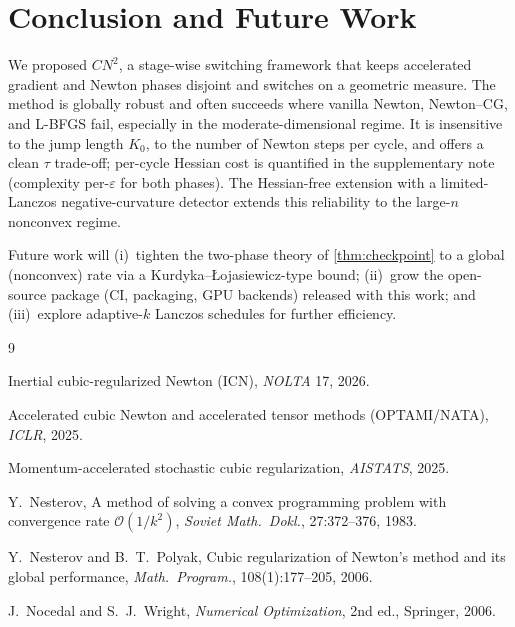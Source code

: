 \documentclass[11pt]{article}
\newcommand{\cn}{CN^2}
\begin{document}
\section{Conclusion and Future Work}
\label{sec:concl}

We proposed $\cn$, a stage-wise switching framework that keeps accelerated gradient and
Newton phases disjoint and switches on a geometric measure. The method is globally robust
and often succeeds where vanilla Newton, Newton--CG, and L-BFGS fail, especially in the
moderate-dimensional regime. It is insensitive to the jump length $K_0$, to the number of
Newton steps per cycle, and offers a clean $\tau$ trade-off; per-cycle Hessian cost is
quantified in the supplementary note (complexity per-$\varepsilon$ for both phases).
The Hessian-free extension with a limited-Lanczos negative-curvature detector extends this
reliability to the large-$n$ nonconvex regime.

Future work will (i)~tighten the two-phase theory of \cref{thm:checkpoint} to a global
(nonconvex) rate via a Kurdyka--{\L}ojasiewicz-type bound; (ii)~grow the
open-source package (CI, packaging, GPU backends) released with this work; and
(iii)~explore adaptive-$k$ Lanczos schedules for further efficiency.

\begin{thebibliography}{9}

Inertial cubic-regularized Newton (ICN), \emph{NOLTA} 17, 2026.

Accelerated cubic Newton and accelerated tensor methods (OPTAMI/NATA), \emph{ICLR}, 2025.

Momentum-accelerated stochastic cubic regularization, \emph{AISTATS}, 2025.

Y.~Nesterov, A method of solving a convex programming problem with convergence rate
$\mathcal{O}(1/k^2)$, \emph{Soviet Math.\ Dokl.}, 27:372--376, 1983.

Y.~Nesterov and B.~T.~Polyak, Cubic regularization of Newton's method and its global
performance, \emph{Math.\ Program.}, 108(1):177--205, 2006.

J.~Nocedal and S.~J.~Wright, \emph{Numerical Optimization}, 2nd ed., Springer, 2006.

\end{thebibliography}
\end{document}
